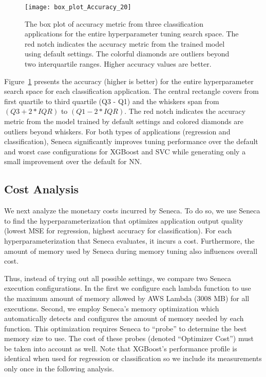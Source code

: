 \begin{figure}[t] \centering 
\texttt{[image: box\_plot\_Accuracy\_20]}
\vspace{-0.4in}
\caption{The box plot of accuracy metric from three classification applications for the entire hyperparameter tuning search space. The red notch indicates the accuracy metric from the trained model using default settings. The colorful diamonds are outliers beyond two interquartile ranges. Higher accuracy values are better.
\label{fig:box_plot_accuracy}}
\vspace{-0.1in}
\end{figure}

Figure~\ref{fig:box_plot_accuracy} presents the accuracy (higher is better) 
for the entire hyperparameter search space for each classification
application.  The central rectangle covers from first quartile to third quartile (Q3 - Q1) and the whiskers span from \texttt{$(Q3 + 2 * IQR)$} to \texttt{$(Q1 - 2 * IQR)$}. The red notch indicates the accuracy metric from the model trained by default settings and colored diamonds are outliers beyond whiskers.
For both types of applications (regression and classification), Seneca significantly
improves tuning performance over the default and worst case configurations for 
XGBoost and SVC while generating only a small improvement over the
default for NN.  


\subsection{Cost Analysis}

We next analyze the monetary costs incurred by Seneca.  To do so, we
use Seneca to find the hyperparameterization that optimizes application output
quality (lowest MSE for regression, highest accuracy for classification).
For each hyperparameterization that Seneca evaluates, it incurs a
cost. Furthermore, the amount of memory used by Seneca during memory
tuning also influences overall cost.

Thus, instead of trying out all possible settings,  we compare two
Seneca execution configurations.  In the first 
we configure each lambda function to
use the maximum amount of memory allowed by AWS Lambda (3008 MB) for all
executions.
Second, we
employ Seneca's memory optimization which automatically detects and configures
the amount of memory needed by each function.  This optimization requires
Seneca to ``probe'' to determine the best memory size to use.  The
cost of these probes
(denoted ``Optimizer Cost'') must be taken into account as well.
Note that XGBoost's performance profile is identical when used for regression
or classification so we include its measurements only once in the following
analysis.

